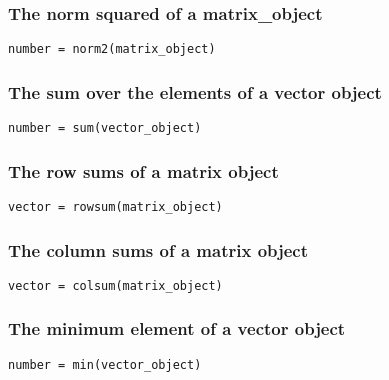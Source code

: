 \documentclass{admbmanual}
\begin{document}
\subsubsection{The norm squared of a matrix\_object}
\begin{lstlisting}
number = norm2(matrix_object)
\end{lstlisting}
\bigskip

\subsubsection{The sum over the elements of a vector object}
\begin{lstlisting}
number = sum(vector_object)
\end{lstlisting}
\bigskip

\subsubsection{The row sums of a matrix object}
\begin{lstlisting}
vector = rowsum(matrix_object)
\end{lstlisting}
\bigskip

\subsubsection{The column sums of a matrix object}
\begin{lstlisting}
vector = colsum(matrix_object)
\end{lstlisting}
\bigskip

\subsubsection{The minimum element of a vector object}
\begin{lstlisting}
number = min(vector_object)
\end{lstlisting}
\bigskip
\end{document}
